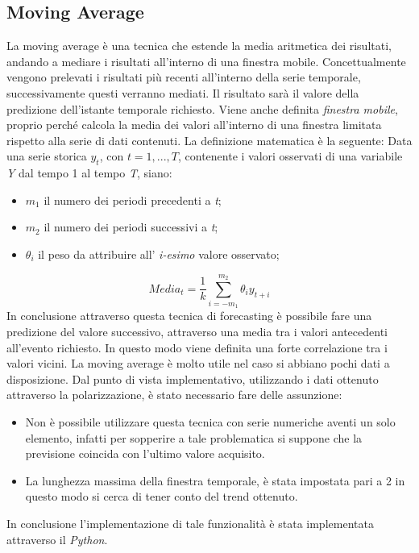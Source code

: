 \subsection{Moving Average}
\label{moving}
La moving average  è una tecnica che estende la media aritmetica dei risultati, andando a mediare i risultati all'interno di una finestra mobile.
Concettualmente vengono prelevati i risultati più recenti all'interno della serie temporale, successivamente questi verranno mediati. Il risultato sarà il valore della predizione dell'istante temporale richiesto.\cite{Moving}
Viene anche definita \textit{finestra mobile}, proprio perché calcola la media dei valori all'interno di una finestra limitata rispetto alla serie di dati contenuti.
La definizione matematica è la seguente:
Data una serie storica $y_{t}$, con $\textit{t}= 1,...,T$, contenente i valori osservati di una variabile \textit{Y}  dal tempo 1 al tempo \textit{T}, siano:
\begin{itemize}
\item $m_{1}$ il numero dei periodi precedenti a \textit{t};
\item $m_{2}$ il numero dei periodi successivi a \textit{t};
\item $\theta_{i}$ il peso da attribuire all' \textit{i-esimo} valore osservato;
\end{itemize}
\begin{equation}
Media_{t}= \dfrac{1}{k} \sum_{i=-m_{1}}^{m_{2}}\theta_{i}y_{t+i}
\end{equation}
In conclusione attraverso questa tecnica di forecasting è possibile fare una predizione del valore successivo, attraverso una media tra i valori antecedenti all'evento richiesto. In questo modo viene definita una forte correlazione tra i valori vicini. La moving average è molto utile nel caso si abbiano pochi dati a disposizione.
Dal punto di vista implementativo, utilizzando i dati ottenuto attraverso la polarizzazione, è stato necessario fare delle assunzione:
\begin{itemize}
\item Non è possibile utilizzare questa tecnica con serie numeriche aventi un solo elemento, infatti per sopperire a tale problematica si suppone che la previsione coincida con l'ultimo valore acquisito.
\item La lunghezza massima della finestra temporale, è stata impostata pari a 2 in questo modo si cerca di tener conto del trend ottenuto.
\end{itemize}
In conclusione l'implementazione di tale funzionalità è stata implementata attraverso il \textit{Python}.
